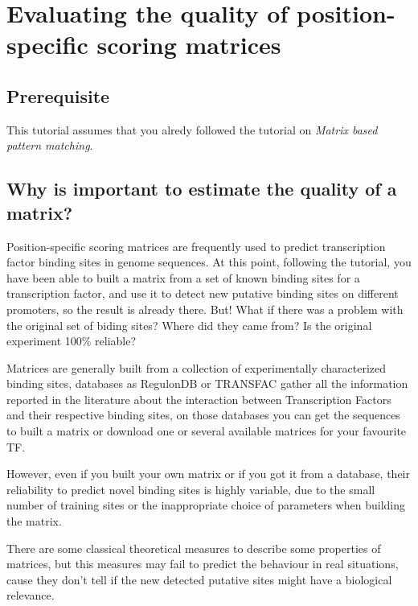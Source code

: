 
\chapter{Evaluating the quality of position-specific scoring matrices}

\section{Prerequisite}

This tutorial assumes that you alredy followed the tutorial on
\textit{Matrix based pattern matching}.

\section{Why is important to estimate the quality of a matrix?}

Position-specific scoring matrices are frequently used to predict
transcription factor binding sites in genome sequences.  At this
point, following the tutorial, you have been able to built a matrix
from a set of known binding sites for a transcription factor, and use
it to detect new putative binding sites on different promoters, so the
result is already there. But! What if there was a problem with the
original set of biding sites? Where did they came from? Is the
original experiment 100\% reliable?

Matrices are generally built from a collection of experimentally
characterized binding sites, databases as RegulonDB or TRANSFAC gather
all the information reported in the literature about the interaction
between Transcription Factors and their respective binding sites, on
those databases you can get the sequences to built a matrix or
download one or several available matrices for your favourite TF.

However, even if you built your own matrix or if you got it from a
database, their reliability to predict novel binding sites is highly
variable, due to the small number of training sites or the
inappropriate choice of parameters when building the matrix.

There are some classical theoretical measures to describe some
properties of matrices, but this measures may fail to predict the
behaviour in real situations, cause they don't tell if the new
detected putative sites might have a biological relevance.

